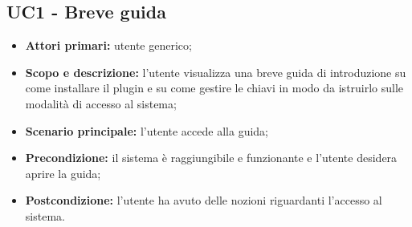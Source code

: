 \documentclass[AnalisiDeiRequisiti.tex]{subfiles}
\begin{document}

\subsection{UC1 - Breve guida}
\begin{itemize}
	\item \textbf{Attori primari:} utente generico;
	\item \textbf{Scopo e descrizione:} l'utente visualizza una breve guida di introduzione su come installare il plugin  e su come gestire le chiavi in modo da istruirlo sulle modalità di accesso al sistema;
	\item \textbf{Scenario principale:} l'utente accede alla guida;
	\item \textbf{Precondizione:} il sistema è raggiungibile e funzionante e l'utente desidera aprire la guida;
	\item \textbf{Postcondizione:} l'utente ha avuto delle nozioni riguardanti l'accesso al sistema.
\end{itemize}
\end{document}
